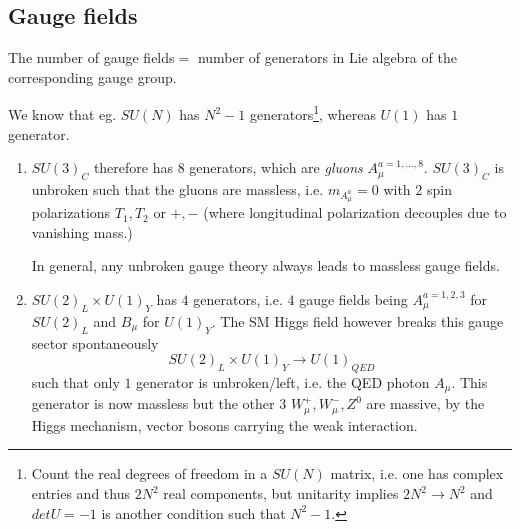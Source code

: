  \subsection{Gauge fields}
 \begin{statements}
 	The number of gauge fields$=$ number of generators in Lie algebra of the corresponding gauge group.
 \end{statements}
We know that eg. $SU(N)$ has $N^2-1$ generators\footnote{Count the real degrees of freedom in a $SU(N)$ matrix, i.e. one has complex entries and thus $2 N^2$ real components, but unitarity implies $2 N^2\rightarrow N^2$ and $detU=-1$ is another condition such that $N^2-1$. }, whereas $U(1)$ has $1$ generator. 
\begin{enumerate}
	\item $SU(3)_C$ therefore has $8$ generators, which are \emph{gluons} $A^{a=1,\dots,8}_\mu$. $SU(3)_C$ is unbroken such that the gluons are massless, i.e. $m_{A^a_\mu}=0$ with $2$ spin polarizations $T_1,T_2$ or $+,-$ (where longitudinal polarization decouples due to vanishing mass.)
	\begin{statements}
		In general, any unbroken gauge theory always leads to massless gauge fields.
	\end{statements}
\item $SU(2)_L \times U(1)_Y$ has $4$ generators, i.e. $4$ gauge fields being $A^{a=1,2,3}_\mu$ for $SU(2)_L$ and $B_\mu$ for $U(1)_Y$. The SM Higgs field however breaks this gauge sector spontaneously 
\begin{equation*}
	SU(2)_L\times U(1)_Y \longrightarrow U(1)_{QED}
\end{equation*}
such that only $1$ generator is unbroken/left, i.e. the QED photon $A_\mu$. This generator is now massless but the other $3$ $W^+_\mu,W^-_\mu,Z^0$ are massive, by the Higgs mechanism, vector bosons carrying the weak interaction.
\end{enumerate}
